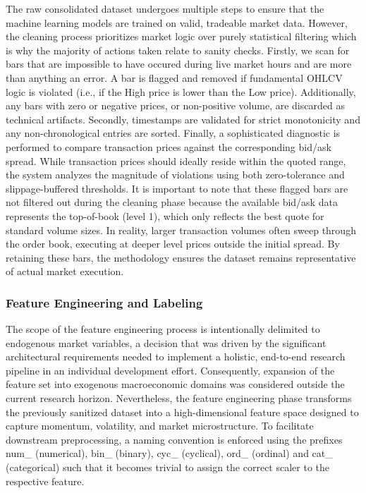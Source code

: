 \documentclass[12pt, a4paper]{article}
\begin{document}
The raw consolidated dataset undergoes multiple steps to ensure that the machine learning models are trained on valid, tradeable market data. However, the cleaning
process prioritizes market logic over purely statistical filtering which is why the majority of actions taken relate to sanity checks.
Firstly, we scan for bars that are impossible to have occured during live market hours and are more than anything an error. 
A bar is flagged and removed if fundamental OHLCV logic is violated (i.e., if the High price is lower than the Low price). 
Additionally, any bars with zero or negative prices, or non-positive volume, are discarded as technical artifacts.
Secondly, timestamps are validated for strict monotonicity and any non-chronological entries are sorted.
Finally, a sophisticated diagnostic is performed to compare transaction prices against the corresponding bid/ask spread. 
While transaction prices should ideally reside within the quoted range, the system analyzes the magnitude of violations using both zero-tolerance and slippage-buffered thresholds. 
It is important to note that these flagged bars are not filtered out during the cleaning phase because the available bid/ask data represents 
the top-of-book (level 1), which only reflects the best quote for standard volume sizes. 
In reality, larger transaction volumes often sweep through the order book, executing at deeper level prices outside the initial spread. 
By retaining these bars, the methodology ensures the dataset remains representative of actual market execution.


\subsubsection{Feature Engineering and Labeling}\label{sec:features_labels}

The scope of the feature engineering process is intentionally delimited to endogenous market variables, a decision that was driven by the significant 
architectural requirements needed to implement a holistic, end-to-end research pipeline in an individual development effort. 
Consequently, expansion of the feature set into exogenous macroeconomic domains was considered outside the current research horizon.
Nevertheless, the feature engineering phase transforms the previously sanitized dataset into a high-dimensional feature space designed to capture momentum, volatility, and market microstructure. 
To facilitate downstream preprocessing, a naming convention is enforced using the prefixes num\_ (numerical), bin\_ (binary), cyc\_ (cyclical), ord\_ (ordinal) and cat\_ (categorical) such that it becomes 
trivial to assign the correct scaler to the respective feature.
\end{document}
